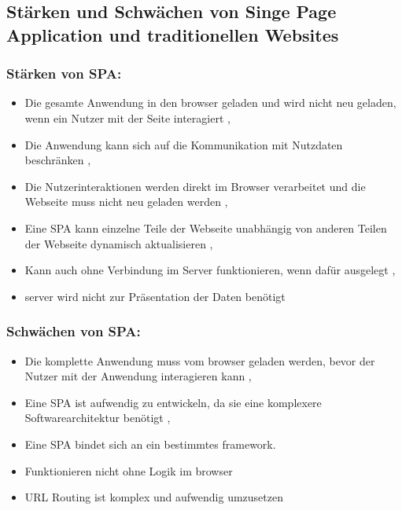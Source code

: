 \subsection{Stärken und Schwächen von Singe Page Application und traditionellen Websites}

\subsubsection*{Stärken von \ac{SPA}:}
\begin{itemize}
  \item Die gesamte Anwendung in den \gls{browser} geladen und wird nicht neu geladen, wenn ein Nutzer mit der Seite interagiert \cite{Smith2022}, \cite{Flanagan2011}
  \item Die Anwendung kann sich auf die Kommunikation mit Nutzdaten beschränken \cite{Smith2022}, \cite{Flanagan2011}
  \item Die Nutzerinteraktionen werden direkt im Browser verarbeitet und die Webseite muss nicht neu geladen werden \cite{Smith2022}, \cite{Flanagan2011}
  \item Eine \ac{SPA} kann einzelne Teile der Webseite unabhängig von anderen Teilen der Webseite dynamisch aktualisieren \cite{Smith2022}, \cite{Irudayaraj2019}
  \item Kann auch ohne Verbindung im Server funktionieren, wenn dafür ausgelegt \cite{Smith2022}, \cite{Gavrila2019}
  \item \gls{server} wird nicht zur Präsentation der Daten benötigt \cite{Flanagan2011}
\end{itemize}


\subsubsection*{Schwächen von \ac{SPA}:}

\begin{itemize}
  \item Die komplette Anwendung muss vom \gls{browser} geladen werden, bevor der Nutzer mit der Anwendung interagieren kann \cite{Smith2022}, \cite{Gavrila2019}
  \item Eine \ac{SPA} ist aufwendig zu entwickeln, da sie eine komplexere Softwarearchitektur benötigt \cite{Smith2022}, \cite{Flanagan2011}
  \item Eine \ac{SPA} bindet sich an ein bestimmtes \gls{framework}. \cite{Smith2022}
  \item Funktionieren nicht ohne Logik im \gls{browser} \cite{Smith2022}
  \item \ac{URL} Routing ist komplex und aufwendig umzusetzen \cite{Smith2022}
\end{itemize}

